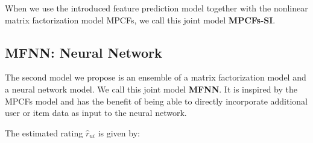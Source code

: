 %

When we use the introduced feature prediction model together with the nonlinear matrix factorization model MPCFs, we call this joint model \textbf{MPCFs-SI}.

\subsection{MFNN: Neural Network}
\label{sst:mfnn}

The second model we propose is an ensemble of a matrix factorization model and a neural network model.
We call this joint model \textbf{MFNN}.
It is inspired by the MPCFs model and has the benefit of being able to directly incorporate additional user or item data as input to the neural network.

The estimated rating \textit{$\hat{r}_{ui}$} is given by:


